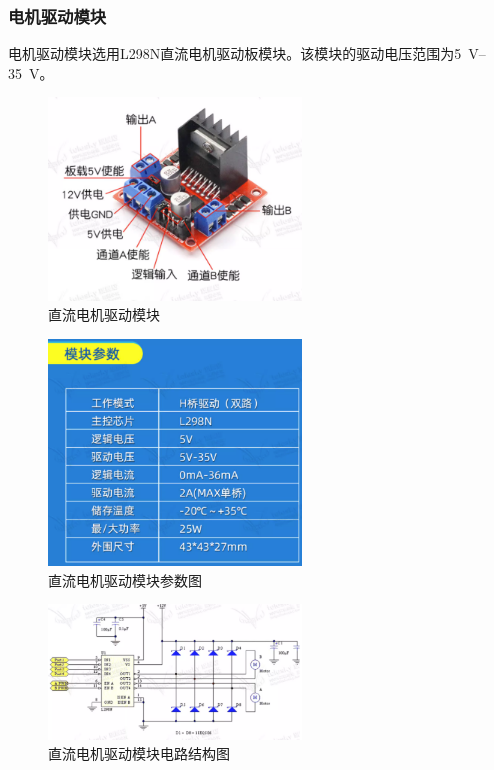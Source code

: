 \documentclass[10pt]{ctexart}
\begin{document}
\subsubsection{电机驱动模块}
电机驱动模块选用L298N直流电机驱动板模块。该模块的驱动电压范围为\SIrange{5}{35}{\volt}。


\begin{figure}[H]
    \centering
    \includegraphics[width=0.6\textwidth]{drive/drive.png}
    \caption{直流电机驱动模块}
    \label{fig:drive}
\end{figure}

\begin{figure}[H]
    \centering
    \includegraphics[width=0.6\textwidth]{drive/drive_parameter1.png}
    \caption{直流电机驱动模块参数图}
    \label{fig:drive_parameter1}
\end{figure}

\begin{figure}[H]
    \centering
    \includegraphics[width=0.6\textwidth]{drive/drive_parameter2.png}
    \caption{直流电机驱动模块电路结构图}
    \label{fig:drive_parameter2}
\end{figure}
\end{document}
